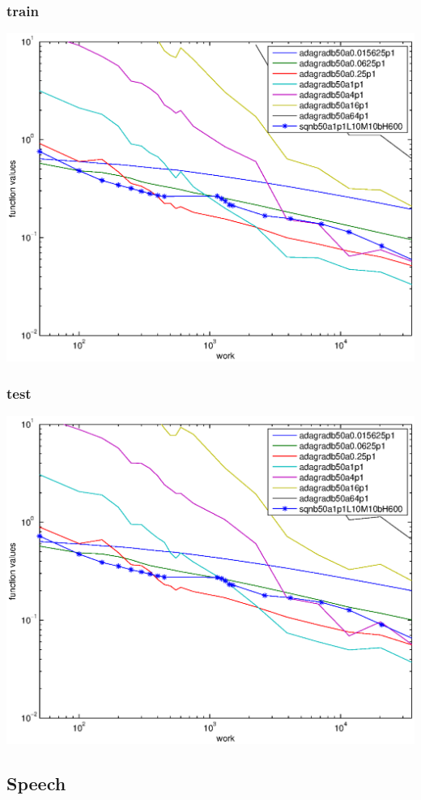 \documentclass[12pt]{article}
\begin{document}
\subsubsection{train}
\includegraphics[scale=1]{paperOnImpFigures/yoram-adagrad-l-train.eps}

\subsubsection{test}
\includegraphics[scale=1]{paperOnImpFigures/yoram-adagrad-l-test.eps}

\subsection{Speech}
\end{document}
